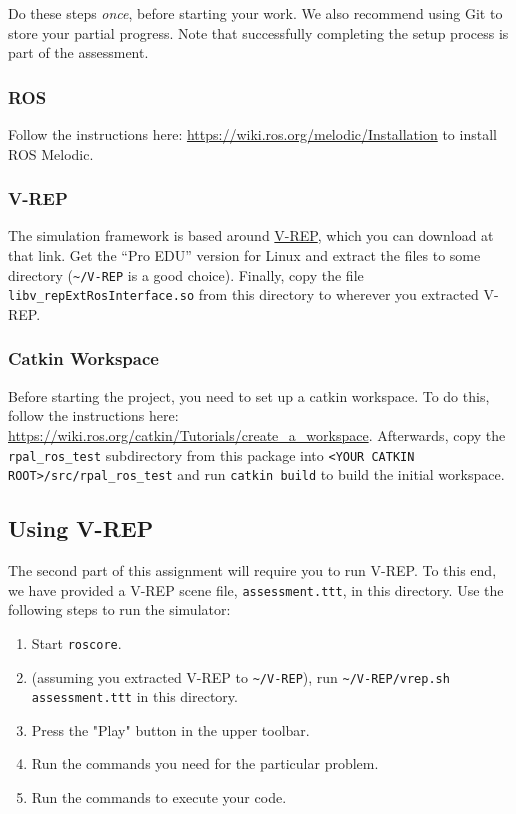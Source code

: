 \documentclass[11pt]{article}
\begin{document}
Do these steps \emph{once}, before starting your work. We also recommend using Git to store your
partial progress. Note that successfully completing the setup process is part of the assessment.

\subsubsection{ROS}

Follow the instructions here: \url{https://wiki.ros.org/melodic/Installation} to install ROS
Melodic.

\subsubsection{V-REP}

The simulation framework is based around
\href{http://www.coppeliarobotics.com/downloads.html}{V-REP}, which you can download at that link.
Get the ``Pro EDU'' version for Linux and extract the files to some directory
(\texttt{\textasciitilde/V-REP} is a good choice). Finally, copy the file
\texttt{libv\_repExtRosInterface.so} from this directory to wherever you extracted V-REP.

\subsubsection{Catkin Workspace}

Before starting the project, you need to set up a catkin workspace. To do this, follow the
instructions here: \url{https://wiki.ros.org/catkin/Tutorials/create_a_workspace}. Afterwards, copy
the \texttt{rpal\_ros\_test} subdirectory from this package into \texttt{<YOUR CATKIN
ROOT>/src/rpal\_ros\_test} and run \texttt{catkin build} to build the initial workspace.

\subsection{Using V-REP}

The second part of this assignment will require you to run V-REP. To this end, we have provided a
V-REP scene file, \texttt{assessment.ttt}, in this directory. Use the following steps to run the
simulator:
\begin{enumerate}
  \item Start \texttt{roscore}.
  \item (assuming you extracted V-REP to \texttt{\textasciitilde/V-REP}), run
  \texttt{\textasciitilde/V-REP/vrep.sh assessment.ttt} in this directory.
  \item Press the "Play" button in the upper toolbar.
  \item Run the commands you need for the particular problem.
  \item Run the commands to execute your code.
\end{enumerate}  
\end{document}
